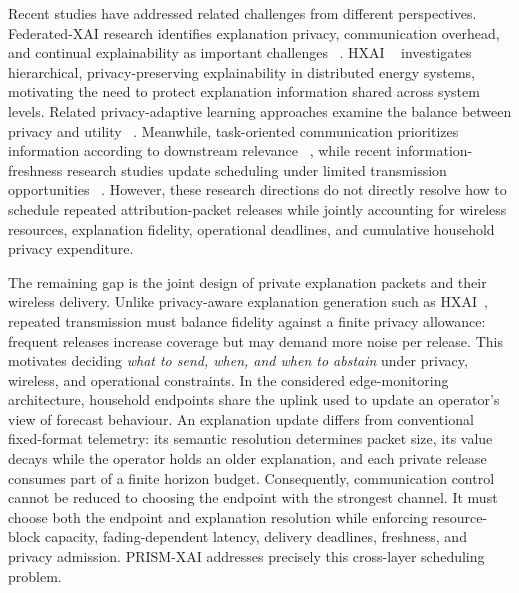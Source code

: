 \documentclass[conference]{IEEEtran}
\begin{document}
Recent studies have addressed related challenges from
different perspectives. Federated-XAI research identifies
explanation privacy, communication overhead, and continual
explainability as important challenges
~\cite{gholizade2026fedxai}. HXAI
~\cite{sengupta2026hxai} investigates hierarchical,
privacy-preserving explainability in distributed energy
systems, motivating the need to protect explanation
information shared across system levels. Related
privacy-adaptive learning approaches examine the
balance between privacy and utility
~\cite{piran2025privatedfl,li2026fedsva}.
Meanwhile, task-oriented communication prioritizes
information according to downstream relevance
~\cite{ma2023semantic}, while recent information-freshness
research studies update scheduling under limited
transmission opportunities
~\cite{aoi2025feedback,aoi2025updates}.
However, these research directions do not directly
resolve how to schedule repeated attribution-packet
releases while jointly accounting for wireless
resources, explanation fidelity, operational deadlines,
and cumulative household privacy expenditure.



The remaining gap is the joint design of private explanation packets
and their wireless delivery. Unlike privacy-aware explanation generation
such as HXAI~\cite{sengupta2026hxai}, repeated transmission must balance
fidelity against a finite privacy allowance: frequent releases increase
coverage but may demand more noise per release. This motivates deciding
\emph{what to send, when, and when to abstain} under privacy, wireless,
and operational constraints.
In the considered edge-monitoring architecture, household endpoints share the
uplink used to update an operator's view of forecast behaviour. An explanation
update differs from conventional fixed-format telemetry: its semantic
resolution determines packet size, its value decays while the operator holds
an older explanation, and each private release consumes part of a finite
horizon budget. Consequently, communication control cannot be reduced to
choosing the endpoint with the strongest channel. It must choose both the
endpoint and explanation resolution while enforcing resource-block capacity,
fading-dependent latency, delivery deadlines, freshness, and privacy
admission. PRISM-XAI addresses precisely this cross-layer scheduling problem.
\end{document}

